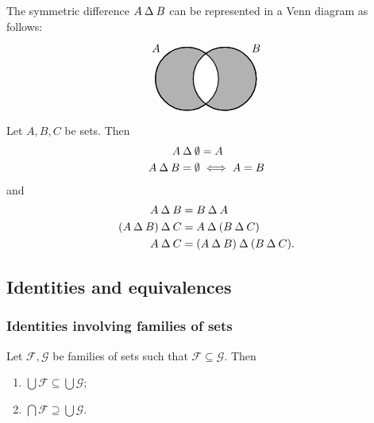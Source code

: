 The symmetric difference $A\mathbin{\Delta} B$ can be represented in a Venn diagram as follows:
\[ \begin{tikzpicture}[thick,
    set/.style = {circle,
        minimum size = 2cm}]

\node[set,draw,fill=black!30,label={135:$A$}] (A) at (0,0) {};

\node[set,draw,fill=black!30,label={45:$B$}] (B) at (1.2,0) {};

\begin{scope}
    \clip (0,0) circle(1cm);
    \clip (1.2,0) circle(1cm);
    \fill[white](0,0) circle(1cm);
\end{scope}

\draw (0,0) circle(1cm);
\draw (1.2,0) circle(1cm);
\end{tikzpicture} \]

\begin{lemma}
Let $A,B,C$ be sets. Then
\begin{align*}
A\mathbin{\Delta} \emptyset &= A \\
A\mathbin{\Delta} B = \emptyset &\iff A = B
\end{align*}
and
\begin{align*}
A \mathbin{\Delta} B &= B \mathbin{\Delta} A \\
(A \mathbin{\Delta} B) \mathbin{\Delta} C &= A \mathbin{\Delta} (B \mathbin{\Delta} C) \\
A \mathbin{\Delta} C &= (A \mathbin{\Delta} B)\mathbin{\Delta}(B \mathbin{\Delta} C).
\end{align*}
\end{lemma}

\subsection{Identities and equivalences}
\subsubsection{Identities involving families of sets}
\begin{lemma}
Let $\mathcal{F}, \mathcal{G}$ be families of sets such that $\mathcal{F}\subseteq \mathcal{G}$. Then
\begin{enumerate}
\item $\bigcup \mathcal{F} \subseteq \bigcup \mathcal{G}$;
\item $\bigcap \mathcal{F} \supseteq \bigcup \mathcal{G}$.
\end{enumerate}
\end{lemma}

